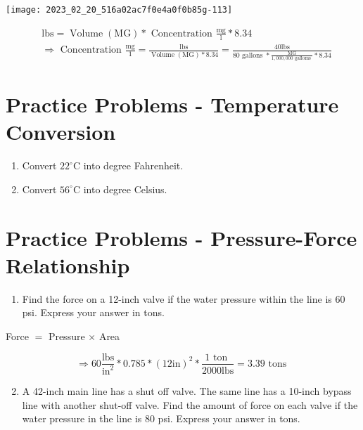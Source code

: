 \documentclass[10pt]{article}
\begin{document}
\begin{enumerate}
\begin{enumerate}
\begin{center}
\texttt{[image: 2023\_02\_20\_516a02ac7f0e4a0f0b85g-113]}
\end{center}

$$
\begin{aligned}
& \mathrm{lbs}=\operatorname{Volume}(\mathrm{MG}) * \text { Concentration } \frac{\mathrm{mg}}{\mathrm{l}} * 8.34 \\
& \Longrightarrow \text { Concentration } \frac{\mathrm{mg}}{1}=\frac{\mathrm{lbs}}{\operatorname{Volume}(\mathrm{MG}) * 8.34}=\frac{40 \mathrm{lbs}}{80 \text { gallons } * \frac{\mathrm{MG}}{1,000,000 \text { galloms }} * 8.34}
\end{aligned}
$$

\section{Practice Problems - Temperature Conversion}
\begin{enumerate}
  \item Convert $22^{\circ} \mathrm{C}$ into degree Fahrenheit.

  \item Convert $56^{\circ} \mathrm{C}$ into degree Celsius.

\end{enumerate}

\section{Practice Problems - Pressure-Force Relationship}
\begin{enumerate}
  \item Find the force on a 12-inch valve if the water pressure within the line is 60 psi. Express your answer in tons.
\end{enumerate}

Force $=$ Pressure $\times$ Area

$$
\Longrightarrow 60 \frac{\mathrm{lbs}}{\mathrm{in}^{2}} * 0.785 *(12 \mathrm{in})^{2} * \frac{1 \text { ton }}{2000 \mathrm{lbs}}=3.39 \text { tons }
$$

\begin{enumerate}
  \setcounter{enumi}{1}
  \item A 42-inch main line has a shut off valve. The same line has a 10-inch bypass line with another shut-off valve. Find the amount of force on each valve if the water pressure in the line is 80 psi. Express your answer in tons.
\end{enumerate}


\end{enumerate}
\end{enumerate}
\end{document}
